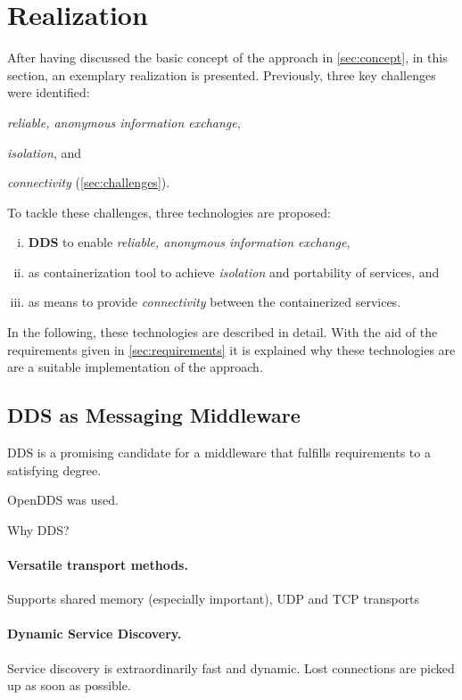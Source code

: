 \section{Realization} \label{sec:realization}
After having discussed the basic concept of the approach in \autoref{sec:concept}, in this section, an exemplary realization is presented. Previously, three key challenges were identified:
\begin{inparaenum}[(i)]
  \item \emph{reliable, anonymous information exchange},
  \item \emph{isolation}, and
  \item \emph{connectivity} (\cf \ref{sec:challenges}). 
\end{inparaenum}
To tackle these challenges, three technologies are proposed:

\begin{enumerate}[(i)]
\item \textbf{DDS} to enable \emph{reliable, anonymous information exchange},
\item \textbf{\docker} as containerization tool to achieve \emph{isolation} and portability of services, and
\item \textbf{\wnet} as means to provide \emph{connectivity} between the containerized services.
\end{enumerate}

In the following, these technologies are described in detail. With the aid of the requirements given in \autoref{sec:requirements} it is explained why these technologies are are a suitable implementation of the  approach. 


\subsection{DDS as Messaging Middleware}

DDS is a promising candidate for a middleware that fulfills requirements to a satisfying degree.

OpenDDS was used.

Why DDS?

\paragraph{Versatile transport methods.} Supports shared memory (especially important), UDP and TCP transports

\paragraph{Dynamic Service Discovery.} Service discovery is extraordinarily fast and dynamic. Lost connections are picked up as soon as possible.

